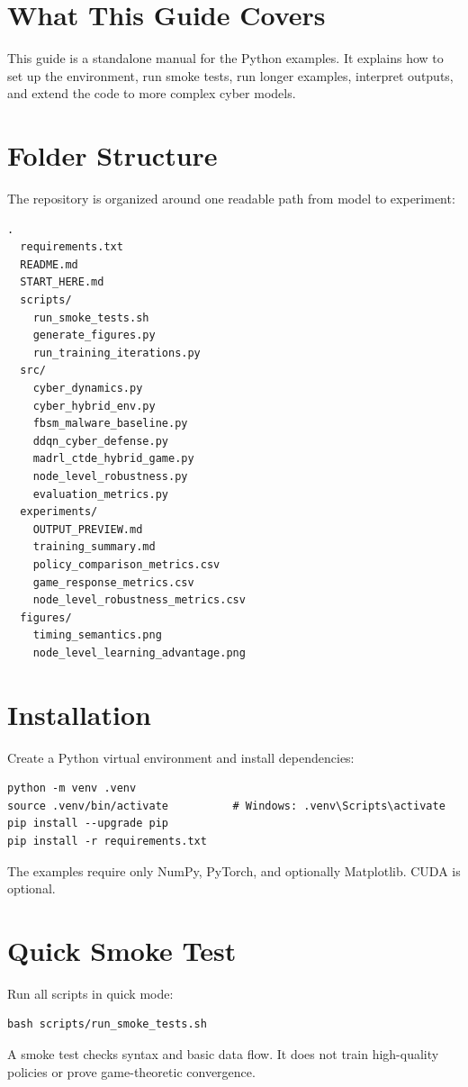 \documentclass[11pt,a4paper]{article}
\begin{document}
\tableofcontents
\newpage
{}

\section{What This Guide Covers}
This guide is a standalone manual for the Python examples. It explains how to set up the environment, run smoke tests, run longer examples, interpret outputs, and extend the code to more complex cyber models.

\section{Folder Structure}
The repository is organized around one readable path from model to experiment:
\begin{verbatim}
.
  requirements.txt
  README.md
  START_HERE.md
  scripts/
    run_smoke_tests.sh
    generate_figures.py
    run_training_iterations.py
  src/
    cyber_dynamics.py
    cyber_hybrid_env.py
    fbsm_malware_baseline.py
    ddqn_cyber_defense.py
    madrl_ctde_hybrid_game.py
    node_level_robustness.py
    evaluation_metrics.py
  experiments/
    OUTPUT_PREVIEW.md
    training_summary.md
    policy_comparison_metrics.csv
    game_response_metrics.csv
    node_level_robustness_metrics.csv
  figures/
    timing_semantics.png
    node_level_learning_advantage.png
\end{verbatim}

\section{Installation}
Create a Python virtual environment and install dependencies:
\begin{lstlisting}[style=pythonstyle]
python -m venv .venv
source .venv/bin/activate          # Windows: .venv\Scripts\activate
pip install --upgrade pip
pip install -r requirements.txt
\end{lstlisting}
The examples require only NumPy, PyTorch, and optionally Matplotlib. CUDA is optional.

\section{Quick Smoke Test}
Run all scripts in quick mode:
\begin{lstlisting}[style=pythonstyle]
bash scripts/run_smoke_tests.sh
\end{lstlisting}
A smoke test checks syntax and basic data flow. It does not train high-quality policies or prove game-theoretic convergence.
\end{document}
